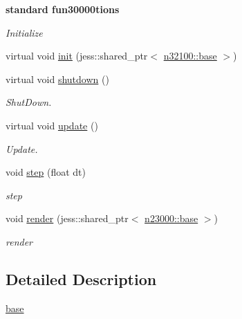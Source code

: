 \begin{Indent}{\bf standard fun30000tions}\par
{\em \label{_amgrp4a9fd2a17d0dcef37f9b76b742ae5989}
 Initialize }\begin{DoxyCompactItemize}
\item 
virtual void \hyperlink{classnebula_1_1content_1_1scene_1_1renderer_1_1base_a64766dd49087647db882e225195036d3}{init} (jess::shared\_\-ptr$<$ \hyperlink{classnebula_1_1content_1_1scene_1_1admin_1_1base}{n32100::base} $>$)
\item 
virtual void \hyperlink{classnebula_1_1content_1_1scene_1_1renderer_1_1base_a62a8f444cb75cfe6ce3d1f49ac37b7bf}{shutdown} ()
\begin{DoxyCompactList}\small\item\em ShutDown. \item\end{DoxyCompactList}\item 
virtual void \hyperlink{classnebula_1_1content_1_1scene_1_1renderer_1_1base_abb85502bfd92c766f6ab75fb6582e30b}{update} ()
\begin{DoxyCompactList}\small\item\em Update. \item\end{DoxyCompactList}\item 
void \hyperlink{classnebula_1_1content_1_1scene_1_1renderer_1_1base_ade885ed707f99d8ad18bbb78f6581f0d}{step} (float dt)
\begin{DoxyCompactList}\small\item\em step \item\end{DoxyCompactList}\item 
void \hyperlink{classnebula_1_1content_1_1scene_1_1renderer_1_1base_af3e68dfb9ae7802dc961638a267c5c52}{render} (jess::shared\_\-ptr$<$ \hyperlink{classnebula_1_1platform_1_1renderer_1_1base}{n23000::base} $>$)
\begin{DoxyCompactList}\small\item\em render \item\end{DoxyCompactList}\end{DoxyCompactItemize}
\end{Indent}


\subsection{Detailed Description}
\hyperlink{classnebula_1_1content_1_1scene_1_1renderer_1_1base}{base} 

